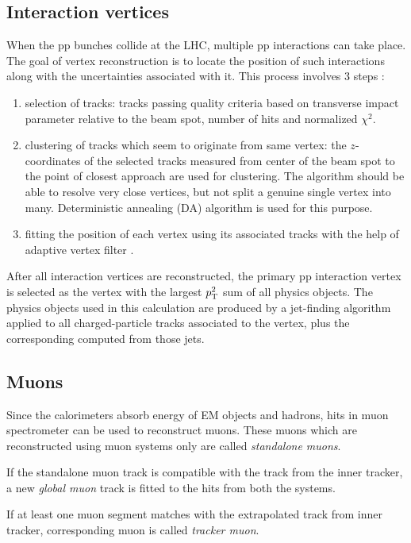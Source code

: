\subsection{Interaction vertices}
When the pp bunches collide at the LHC, multiple pp interactions can take place. The goal of vertex reconstruction is to locate the 
position of such interactions along with the uncertainties associated with it. This process involves 3 steps \cite{Chatrchyan:2014fea}:
\begin{enumerate}
\item selection of tracks: tracks passing quality criteria based on transverse impact parameter relative to the beam spot, number of hits 
and normalized $\chi^2.$
\item clustering of tracks which seem to originate from same vertex: the $z$-coordinates of the selected tracks measured from center of 
the beam spot to the point of closest approach are used for clustering. 
The algorithm should be able to resolve very close vertices, but not split a genuine single vertex into many. Deterministic annealing (DA) 
algorithm \cite{a726788} \cite{Chatrchyan:2014fea} is used for this purpose.
\item fitting the position of each vertex using its associated tracks with the help of adaptive vertex filter \cite{Fruhwirth:2007hz}.
\end{enumerate}
After all interaction vertices are reconstructed, the primary pp interaction vertex is selected as the vertex with the 
largest $p_{\mathrm{T}}^2$ sum of all physics objects. The physics objects used in this calculation are produced by a jet-finding algorithm 
~\cite{Cacciari:2008gp,Cacciari:2011ma} applied to all charged-particle tracks associated to the vertex, plus the corresponding \ptmiss 
computed from those jets.

\subsection{Muons}
Since the calorimeters absorb energy of EM objects and hadrons, hits in muon spectrometer can be used to reconstruct muons. These muons 
which are reconstructed using muon systems only are called \textit{standalone muons}.

If the standalone muon track is compatible with the track from the inner tracker, a new \textit{global muon} track is fitted to the hits 
from both the systems. 

If at least one muon segment matches with the extrapolated track from inner tracker, corresponding muon is called \textit{tracker muon}. 

